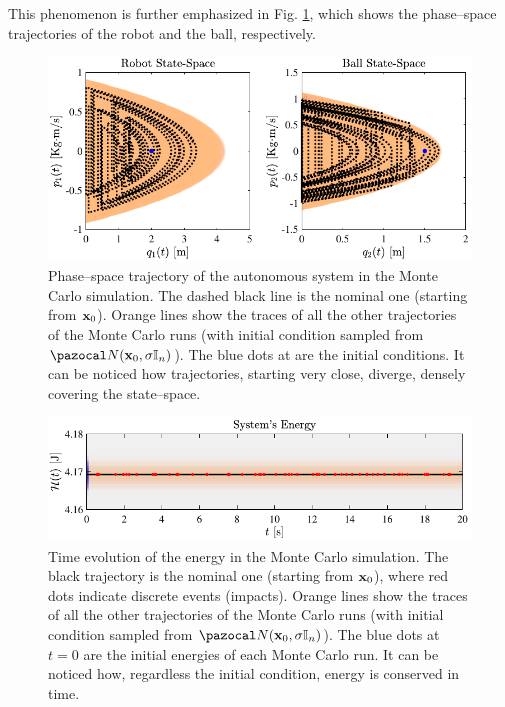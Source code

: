 %

This phenomenon is further emphasized in Fig. \ref{fig:chaos2}, which shows the phase--space trajectories of the robot and the ball, respectively. 
%
\begin{figure}[!ht]
	\centering
	\includegraphics[width = \linewidth]{Figures/chaos2.pdf}
	\caption[Phase--space trajectory of the autonomous system in the Monte Carlo simulation]{Phase--space trajectory of the autonomous system in the Monte Carlo simulation. The dashed black line is the nominal one (starting from $\mathbf{x}_0$). Orange lines show the traces of all the other trajectories of the Monte Carlo runs (with initial condition sampled from $\N(\xb_0,\sigma\mathbb{I}_n)$). The blue dots at are the initial conditions. It can be noticed how trajectories, starting very close, diverge, densely covering the state--space.}
	\label{fig:chaos2}
\end{figure}
%
\begin{figure}[hb!]
	\centering
	\includegraphics[width = \linewidth]{Figures/chaos3.pdf}
	\caption[Time evolution of the energy in the Monte Carlo simulation]{Time evolution of the energy in the Monte Carlo simulation. The black trajectory is the nominal one (starting from $\mathbf{x}_0$), where red dots indicate discrete events (impacts). Orange lines show the traces of all the other trajectories of the Monte Carlo runs (with initial condition sampled from $\N(\xb_0,\sigma\mathbb{I}_n)$). The blue dots at $t=0$ are the initial energies of each Monte Carlo run. It can be noticed how, regardless the initial condition, energy is conserved in time.}
	\label{fig:chaos3}
\end{figure}

